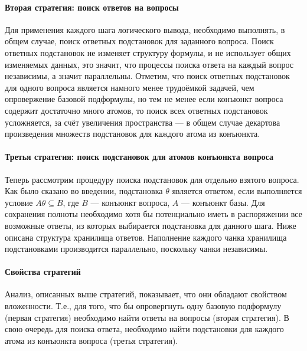 
\paragraph{Вторая стратегия: поиск ответов на вопросы}
Для применения каждого шага логического вывода, необходимо выполнять, в общем случае, поиск ответных подстановок для заданного вопроса. Поиск ответных подстановок не изменяет структуру формулы, и не использует общих изменяемых данных, это значит, что процессы поиска ответа на каждый вопрос независимы, а значит параллельны. Отметим, что поиск ответных подстановок для одного вопроса является намного менее трудоёмкой задачей, чем опровержение базовой подформулы, но тем не менее если конъюнкт вопроса содержит достаточно много атомов, то поиск всех ответных подстановок усложняется, за счёт увеличения пространства --- в общем случае декартова произведения множеств подстановок для каждого атома из конъюнкта.



\paragraph{Третья стратегия: поиск подстановок для атомов конъюнкта вопроса}
Теперь рассмотрим процедуру поиска подстановок для отдельно взятого вопроса. Как было сказано во введении, подстановка $\theta$ является ответом, если выполняется условие $A\theta \subseteq B$, где $B$ --- конъюнкт вопроса, $A$ --- конъюнкт базы. Для сохранения полноты необходимо хотя бы потенциально иметь в распоряжении все возможные ответы, из которых выбирается подстановка для данного шага. Ниже описана структура хранилища ответов. Наполнение каждого чанка хранилища подстановками производится параллельно, поскольку чанки независимы.

\paragraph{Свойства стратегий}

Анализ, описанных выше стратегий, показывает, что они обладают свойством вложенности. Т.е., для того, что бы опровергнуть одну базовую подформулу (первая стратегия) необходимо найти ответы на вопросы (вторая стратегия). В свою очередь для поиска ответа, необходимо найти подстановки для каждого атома из конъюнкта вопроса (третья стратегия).

